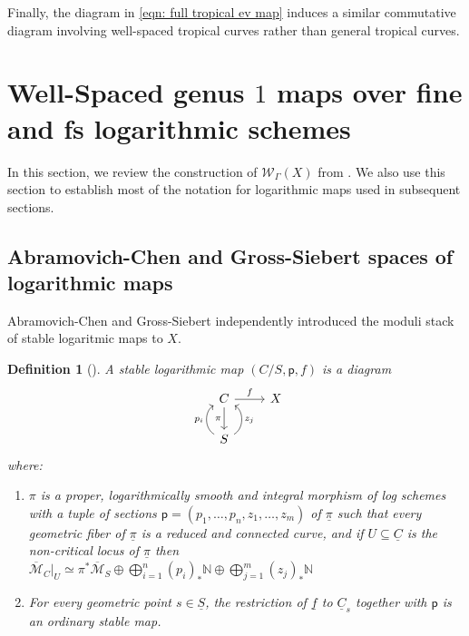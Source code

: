 \documentclass{article}
\def\N{{\mathbb{N}}}
\def\cM{{\overline{\mathcal{M}}}}
\def\cW{\mathcal{W}}
\def\cM{{\mathcal{M}}}
\newtheorem{definition}{Definition}[section]
\begin{document}
Finally, the diagram in \eqref{eqn: full tropical ev map} induces a similar commutative diagram involving well-spaced tropical curves rather than general tropical curves.



\section{Well-Spaced genus $1$ maps over fine and fs logarithmic schemes}

In this section, we review the construction of $\cW_\Gamma(X)$ from \cite{RSWII}. We also use this section to establish most of the notation for logarithmic maps used in subsequent sections.

\subsection{Abramovich-Chen and Gross-Siebert spaces of logarithmic maps}\label{sec: ACGS space}

Abramovich-Chen \cite{AC14} and Gross-Siebert \cite{GS2013} independently introduced the moduli stack of stable logaritmic maps to $X$. 

\begin{definition} [{\cite[definition 2.12]{ACGSI}}]\label{def: stable log map}
A stable logarithmic map $(C/S,\mathsf{p},f)$ is a diagram
\[
\begin{tikzcd} 
& C \arrow[r, "f"] \arrow[d, "\pi"'] & X \\ &S \arrow[u, bend left=60, "p_i"] \arrow[u, bend right=60, "z_j"'] 
\end{tikzcd} 
\] where: 
\begin{enumerate}
    \item $\pi$ is a proper, logarithmically smooth and integral morphism of log schemes with a tuple of sections $\mathsf{p}=(p_1,\ldots,p_n,z_1,\ldots,z_m)$ of $\underline{\pi}$ such that every geometric fiber of $\underline{\pi}$ is a reduced and connected curve, and if $U \subseteq \underline{C}$ is the non-critical locus of $\underline{\pi}$ then $\overline{\cM}_C|_U \simeq \pi^*\overline{\cM}_S \oplus \bigoplus_{i=1}^n (p_i)_* \mathbb{N} \oplus \bigoplus_{j=1}^m (z_j)_*\N$
    \item For every geometric point $s \in \underline{S}$, the restriction of $\underline{f}$ to $\underline{C}_s$ together with $\mathsf{p}$ is an ordinary stable map. 
\end{enumerate} 
\end{definition}
\end{document}
